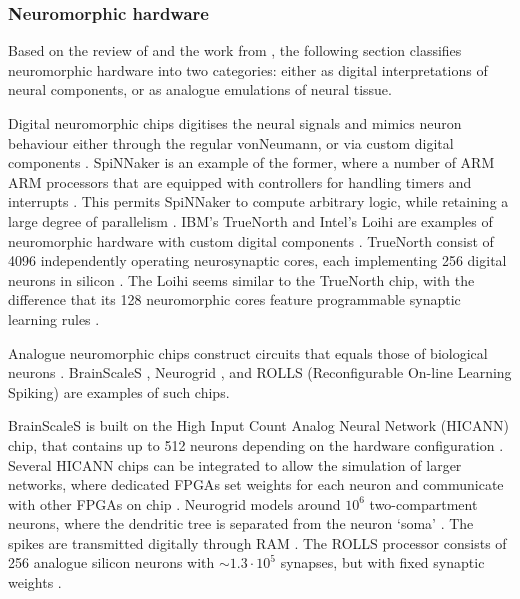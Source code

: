 \documentclass[report.tex]{subfiles}
\begin{document}
\subsubsection{Neuromorphic hardware} \label{sec:similar-neuromorphic}
Based on the review of \textcite{Walter2015} and the work from
\textcite{Lin2018}, the following section classifies neuromorphic hardware into
two categories: either as digital interpretations of neural components, 
or as analogue emulations of neural tissue.

Digital neuromorphic chips digitises the neural signals and mimics neuron
behaviour either through the regular \gls{vonNeumann}, or
via custom digital components \cite{Walter2015}.
SpiNNaker is an example of the former, where a number of ARM \gls{ARM}
processors that are equipped with controllers for handling timers and
interrupts \cite{Walter2015}.
This permits SpiNNaker to compute arbitrary logic, while retaining
a large degree of parallelism \cite{Albada2018}.
IBM's TrueNorth  and Intel's Loihi 
are examples of neuromorphic hardware with custom digital components 
\cite{Walter2015, Lin2018}.
TrueNorth consist of 4096 independently operating neurosynaptic cores, each implementing 256
digital neurons in silicon \cite{Walter2015, ArtificialBrains2018}.
The Loihi seems similar to the TrueNorth chip, with the difference that
its 128 neuromorphic cores feature programmable
synaptic learning rules \cite{Lin2018}.

Analogue neuromorphic chips construct circuits that equals those of biological
neurons \cite{Walter2015}.
BrainScaleS \cite{Schmitt2017}, Neurogrid \cite{BrainsInSilicon2018}, 
and ROLLS (Reconfigurable On-line Learning Spiking)
\cite{Walter2015} are examples of such chips.

BrainScaleS is built on the High Input Count Analog Neural Network (HICANN)
chip, that contains up to 512 neurons depending on the hardware configuration 
\cite{Pfeil2013}.
Several HICANN chips can be integrated to allow the simulation of larger
networks, where dedicated \gls{FPGA}s set weights for each neuron and
communicate with other \gls{FPGA}s on chip \cite{Walter2015}. 
Neurogrid models around $10^6$ two-compartment neurons, where the dendritic
tree is separated from the neuron `soma' \cite{Walter2015}.
The spikes are transmitted digitally through \gls{RAM} \cite{Walter2015}.
The ROLLS processor consists of 256 analogue silicon neurons with
$\sim1.3 \cdot 10^5$ synapses, but with fixed synaptic weights
\cite{Walter2015}.
\end{document}
